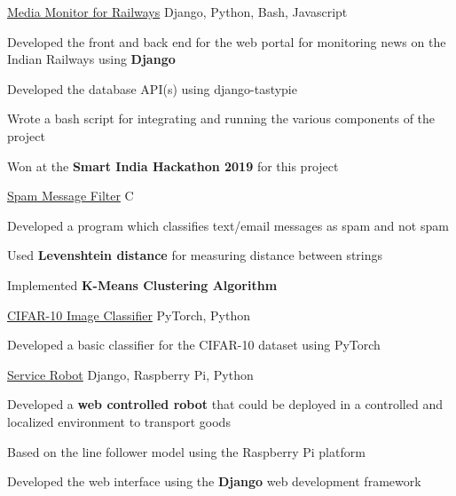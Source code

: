\begin{cventries}
    \projects
    {} %
    {\href{https://github.com/abhineet99/News-sentiment-SIH19}{Media Monitor for Railways}} %
    {Django, Python, Bash, Javascript} %
    {} %
    {
      \begin{cvitems} %
        \item {Developed the front and back end for the web portal for monitoring news on the Indian Railways using \textbf{Django}}
        \item {Developed the database API(s) using django-tastypie}
        \item {Wrote a bash script for integrating and running the various components of the project}
        \item {Won at the \textbf{Smart India Hackathon 2019} for this project}
      \end{cvitems}
    }


\projects
{} %
 {\href{}{Spam Message Filter}} %
 {C} %
 {} %
 {
   \begin{cvitems} %
     \item {Developed a program which classifies text/email messages as spam and not spam}
     \item {Used \textbf{Levenshtein distance} for measuring distance between strings} 
     \item {Implemented \textbf{K-Means Clustering Algorithm}}
   \end{cvitems}
 }

 \projects
{} %
 {\href{https://github.com/vinx-2105/CIFAR-10_Basic_Classifier}{CIFAR-10 Image Classifier}} %
 {PyTorch, Python} %
 {} %
 {
   \begin{cvitems} %
     \item {Developed a basic classifier for the CIFAR-10 dataset using PyTorch}
   \end{cvitems}
 }
  



\projects
   {} %
    {\href{https://github.com/vinx-2105/service_bot}{Service Robot}} %
    {Django, Raspberry Pi, Python} %
    {} %
    {
      \begin{cvitems} %
        \item {Developed a \textbf{web controlled robot} that could be deployed in a controlled and localized environment to transport goods}
        \item {Based on the line follower model using the Raspberry Pi platform}
        \item {Developed the web interface using the \textbf{Django} web development framework}
      \end{cvitems}
    }
  

\end{cventries}
